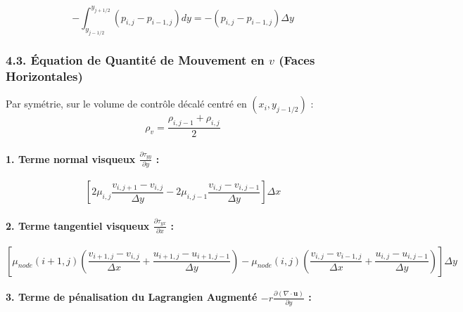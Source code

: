 \documentclass[
  french,
]{article}
\begin{document}
\[-\int_{y_{j-1/2}}^{y_{j+1/2}} \left( p_{i, j} - p_{i-1, j} \right) dy = - (p_{i, j} - p_{i-1, j}) \Delta y\]

\subsubsection{\texorpdfstring{4.3. Équation de Quantité de Mouvement en
\(v\) (Faces
Horizontales)}{4.3. Équation de Quantité de Mouvement en v (Faces Horizontales)}}\label{uxe9quation-de-quantituxe9-de-mouvement-en-v-faces-horizontales}

Par symétrie, sur le volume de contrôle décalé centré en
\((x_i, y_{j-1/2})\) :
\[\rho_v = \frac{\rho_{i, j-1} + \rho_{i, j}}{2}\]

\paragraph{\texorpdfstring{1. Terme normal visqueux
\(\frac{\partial \tau_{yy}}{\partial y}\)
:}{1. Terme normal visqueux \textbackslash frac\{\textbackslash partial \textbackslash tau\_\{yy\}\}\{\textbackslash partial y\} :}}\label{terme-normal-visqueux-fracpartial-tau_yypartial-y}

\[\left[ 2 \mu_{i, j} \frac{v_{i, j+1} - v_{i, j}}{\Delta y} - 2 \mu_{i, j-1} \frac{v_{i, j} - v_{i, j-1}}{\Delta y} \right] \Delta x\]

\paragraph{\texorpdfstring{2. Terme tangentiel visqueux
\(\frac{\partial \tau_{yx}}{\partial x}\)
:}{2. Terme tangentiel visqueux \textbackslash frac\{\textbackslash partial \textbackslash tau\_\{yx\}\}\{\textbackslash partial x\} :}}\label{terme-tangentiel-visqueux-fracpartial-tau_yxpartial-x}

\[\left[ \mu_{node}(i+1, j) \left( \frac{v_{i+1, j} - v_{i, j}}{\Delta x} + \frac{u_{i+1, j} - u_{i+1, j-1}}{\Delta y} \right) - \mu_{node}(i, j) \left( \frac{v_{i, j} - v_{i-1, j}}{\Delta x} + \frac{u_{i, j} - u_{i, j-1}}{\Delta y} \right) \right] \Delta y\]

\paragraph{\texorpdfstring{3. Terme de pénalisation du Lagrangien
Augmenté \(-r \frac{\partial (\nabla \cdot \mathbf{u})}{\partial y}\)
:}{3. Terme de pénalisation du Lagrangien Augmenté -r \textbackslash frac\{\textbackslash partial (\textbackslash nabla \textbackslash cdot \textbackslash mathbf\{u\})\}\{\textbackslash partial y\} :}}\label{terme-de-puxe9nalisation-du-lagrangien-augmentuxe9--r-fracpartial-nabla-cdot-mathbfupartial-y}
\end{document}
